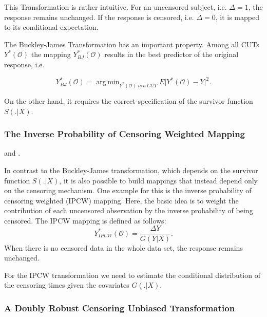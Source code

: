 \documentclass[12pt, a4paper]{article}
\theoremstyle{definition}
\theoremstyle{plain}
\numberwithin{equation}{section}
\numberwithin{figure}{section}
\numberwithin{table}{section}
\DeclareMathOperator*{\argmin}{arg\,min}
\begin{document}
	This Transformation is rather intuitive.
	For an uncensored subject, i.e. $\Delta = 1$, the response remains unchanged.
	If the response is censored, i.e. $\Delta = 0$, it is mapped to its conditional expectation. %
	
	The Buckley-James Transformation has an important property.
	Among all CUTs $Y^*(\mathcal{O})$ the mapping $Y_{BJ}^* (\mathcal{O})$ results in the best predictor of the original response, i.e.
	
	\begin{equation*}
	Y_{BJ}^* (\mathcal{O})= \argmin_{Y^*(\mathcal{O})~is~a~CUT} E \vert Y^*(\mathcal{O}) - Y \vert ^2.
	\end{equation*}
	
	On the other hand, it requires the correct specification of the survivor function $S(.\vert X)$.
	
	\subsubsection{The Inverse Probability of Censoring Weighted Mapping}
	
	\citet*{drcut} and \citet*{drtrees}.
	
	In contrast to the Buckley-James transformation, which depends on the survivor function $S(.\vert X)$, it is also possible to build mappings that instead depend only on the censoring mechanism.
	One example for this is the inverse probability of censoring weighted (IPCW) mapping.
	Here, the basic idea is to weight the contribution of each uncensored observation by the inverse probability of being censored.
	The IPCW mapping is defined as follows:
	\begin{equation*}
	Y_{IPCW}^*(\mathcal{O}) = \frac{\Delta Y}{G(Y \vert X)}.
	\end{equation*}
	When there is no censored data in the whole data set, the response remains unchanged.
	
	For the IPCW transformation we need to estimate the conditional distribution of the censoring times given the covariates $G(.\vert X)$.
	
	
	\subsubsection{A Doubly Robust Censoring Unbiased Transformation}\label{sec:drtrafo}
	
\end{document}
